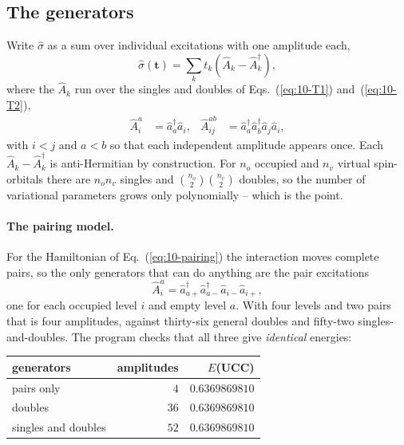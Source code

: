 \subsection{The generators}
\label{sec:uccgenerators}

Write $\hat{\sigma}$ as a sum over individual excitations with one amplitude
each,
\begin{equation}
  \hat{\sigma}(\bm{t}) = \sum_{k}t_k
    \left(\hat{A}_k - \hat{A}_k^{\dagger}\right),
  \label{eq:10-generators}
\end{equation}
where the $\hat{A}_k$ run over the singles and doubles of
Eqs.~(\ref{eq:10-T1}) and~(\ref{eq:10-T2}),
\begin{align}
  \hat{A}_i^a &= \hat{a}^{\dagger}_a\hat{a}_i,
  &
  \hat{A}_{ij}^{ab} &= \hat{a}^{\dagger}_a\hat{a}^{\dagger}_b
    \hat{a}_j\hat{a}_i ,
  \label{eq:10-uccsdgenerators}
\end{align}
with $i<j$ and $a<b$ so that each independent amplitude appears once.  Each
$\hat{A}_k-\hat{A}_k^{\dagger}$ is anti-Hermitian by construction.  For $n_o$
occupied and $n_v$ virtual spin-orbitals there are $n_on_v$ singles and
$\binom{n_o}{2}\binom{n_v}{2}$ doubles, so the number of variational
parameters grows only polynomially -- which is the point.

\paragraph{The pairing model.}
For the Hamiltonian of Eq.~(\ref{eq:10-pairing}) the interaction moves
complete pairs, so the only generators that can do anything are the pair
excitations
\begin{equation}
  \hat{A}_i^a
   = \hat{a}^{\dagger}_{a+}\hat{a}^{\dagger}_{a-}
     \hat{a}_{i-}\hat{a}_{i+},
  \label{eq:10-pairgenerator}
\end{equation}
one for each occupied level $i$ and empty level $a$.  With four levels and two
pairs that is four amplitudes, against thirty-six general doubles and
fifty-two singles-and-doubles.  The program checks that all three give
\emph{identical} energies:

\begin{center}
\renewcommand{\arraystretch}{1.2}
\setlength{\tabcolsep}{12pt}
\begin{tabular}{lrr}
\toprule
generators & amplitudes & $E$(UCC)\\
\midrule
pairs only & $4$ & $0.6369869810$\\
doubles & $36$ & $0.6369869810$\\
singles and doubles & $52$ & $0.6369869810$\\
\bottomrule
\end{tabular}
\end{center}

